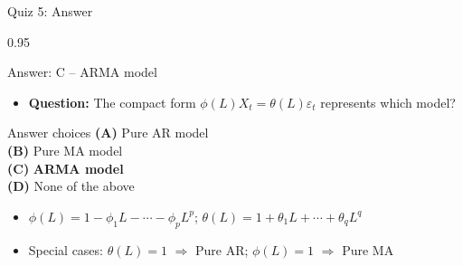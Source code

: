 \documentclass[9pt, aspectratio=169, t]{beamer}
\begin{document}
\begin{frame}{Quiz 5: Answer}
    \begin{cminipage}{0.95\textwidth}
    \begin{exampleblock}{Answer: C -- ARMA model}
        \begin{itemize}\setlength{\itemsep}{0pt}
            \item \textbf{Question:} The compact form $\phi(L)X_t = \theta(L)\varepsilon_t$ represents which model?
        \end{itemize}

        \vspace{0.3cm}

    \begin{block}{Answer choices}
        \textcolor{MainBlue}{\textbf{(A)}} Pure AR model \incorrect\\[3pt]
        \textcolor{MainBlue}{\textbf{(B)}} Pure MA model \incorrect\\[3pt]
        \textcolor{MainBlue}{\textbf{(C)}} \textbf{\textcolor{Forest}{ARMA model}} \correct\\[3pt]
        \textcolor{MainBlue}{\textbf{(D)}} None of the above \incorrect
    \end{block}

        \vspace{0.3cm}

        \begin{itemize}
            \item $\phi(L) = 1 - \phi_1 L - \cdots - \phi_p L^p$; \quad $\theta(L) = 1 + \theta_1 L + \cdots + \theta_q L^q$
            \item Special cases: $\theta(L) = 1$ $\Rightarrow$ Pure AR; \quad $\phi(L) = 1$ $\Rightarrow$ Pure MA
        \end{itemize}
    \end{exampleblock}

    \end{cminipage}
\end{frame}
\end{document}
